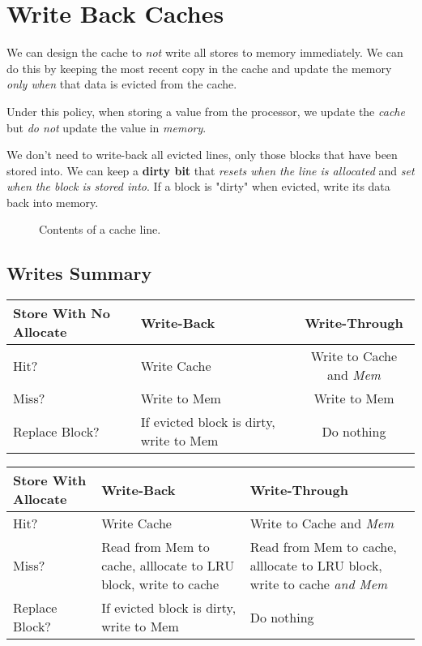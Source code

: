 
\section{Write Back Caches}
We can design the cache to \emph{not} write all stores to memory immediately. We can do this by keeping the most recent copy in the cache and update the memory \emph{only when} that data is evicted from the cache.

\begin{definition}
  Under this policy, when storing a value from the processor, we update the \emph{cache} but \emph{do not} update the value in \emph{memory}.
\end{definition}

We don't need to write-back all evicted lines, only those blocks that have been stored into. We can keep a \textbf{dirty bit} that \emph{resets when the line is allocated} and \emph{set when the block is stored into}. If a block is "dirty" when evicted, write its data back into memory.

\begin{figure}[H]
  \centering
  \caption{Contents of a cache line.}
  \label{fig:cachelinecontents}
\end{figure}

\subsection*{Writes Summary}

\begin{center}
  \begin{tabular}{|l|p{6cm}|c|}
    \hline
    Store With \textbf{No Allocate}  & Write-Back & Write-Through \\
    \hline
    Hit? & Write Cache & Write to Cache and \emph{Mem} \\
    Miss? & Write to Mem & Write to Mem \\
    Replace Block? & If evicted block is dirty, write to Mem & Do nothing \\
    \hline
  \end{tabular}
\end{center}
\begin{center}
  \begin{tabular}{|l|p{6cm}|p{6cm}|}
    \hline
    Store With \textbf{Allocate}  & Write-Back & Write-Through \\
    \hline
    Hit? & Write Cache & Write to Cache and \emph{Mem} \\
    Miss? & Read from Mem to cache, alllocate to LRU block, write to cache & Read from Mem to cache, alllocate to LRU block, write to cache \emph{and Mem} \\
    Replace Block? & If evicted block is dirty, write to Mem & Do nothing \\
    \hline
  \end{tabular}
\end{center}

